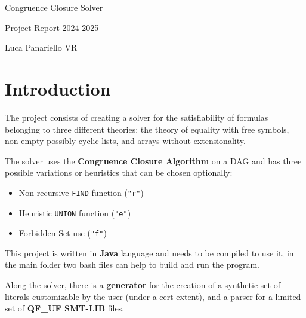\documentclass[11pt,a4paper]{article}
\begin{document}
    
    \begin{center}
        \Huge Congruence Closure Solver

        \LARGE Project Report 2024-2025

        \Large {Luca Panariello VR}
    \end{center}

    \vspace{0.5em}

    \section{Introduction}

    The project consists of creating a solver for the satisfiability of formulas belonging to three different theories: the theory of equality with free symbols, non-empty possibly cyclic lists, and arrays without extensionality.

    The solver uses the \textbf{Congruence Closure Algorithm} on a DAG and has three possible variations or heuristics that can be chosen optionally:
    \begin{itemize}
        \item Non-recursive \texttt{FIND} function (\texttt{"r"})
        \item Heuristic \texttt{UNION} function (\texttt{"e"})
        \item Forbidden Set use (\texttt{"f"})
    \end{itemize}

    This project is written in \textbf{Java} language and needs to be compiled to use it, in the main folder two bash files can help to build and run the program.

    Along the solver, there is a \textbf{generator} for the creation of a synthetic set of literals customizable by the user (under a cert extent), and a parser for a limited set of \textbf{QF\_UF SMT-LIB} files.
\end{document}
